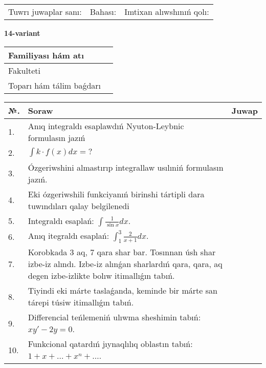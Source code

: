 \documentclass{article}
\begin{document}
\vspace{1cm}

\begin{tabular}{ c c c }
Tuwrı juwaplar sanı: \underline{\hspace{2cm}} & Bahası: \underline{\hspace{2cm}} & Imtixan alıwshınıń qolı: \underline{\hspace{2cm}} \\
\end{tabular}

\newpage

\begin{center}\textbf{14-variant}\end{center}

\bgroup
\def\arraystretch{1.5}
\begin{tabular}{ |m{6cm}|m{10cm}| }
  \hline
  Familiyası hám atı & \\
  \hline
  Fakulteti &\\
  \hline
  Toparı hám tálim baǵdarı & \\
  \hline
\end{tabular}
\egroup

\vspace{0.5cm}

\bgroup
\def\arraystretch{2}
\begin{tabular}{ |l|m{8cm}|m{7cm}| }
  \hline
  №. & Soraw & Juwap \\
  \hline
  1. & Anıq integraldı esaplawdıń Nyuton-Leybnic formulasın jazıń &  \\
  \hline
  2. & $\displaystyle\int k \cdot f(x)dx = ?$ &  \\
  \hline
  3. & Ózgeriwshini almastırıp integrallaw usılıniń formulasın jazıń. &  \\
  \hline
  4. & Eki ózgeriwshili funkciyanıń birinshi tártipli dara tuwındıları qalay belgilenedi &  \\
  \hline
  5. & Integraldı esaplań: $\displaystyle\int {\frac{1}{\sin x}dx} $. &  \\
  \hline
  6. & Anıq itegraldı esaplań: $\displaystyle\int_{1}^{3}{\frac{2}{x + 1}dx}$. &  \\
  \hline
  7. & Korobkada 3 aq, 7 qara shar bar. Tosınnan úsh shar izbe-iz alındı. Izbe-iz alınǵan sharlardıń qara, qara, aq degen izbe-izlikte bolıw itimallıǵın tabıń. &  \\
  \hline
  8. & Tiyindi eki márte taslaǵanda, keminde bir márte san tárepi túsiw itimallıǵın tabıń. &  \\
  \hline
  9. & Differencial teńlemeniń ulıwma sheshimin tabıń: $xy' - 2y = 0$. &  \\
  \hline
  10. & Funkcional qatardıń jıynaqlılıq oblastın tabıń: $1 + x + \ldots + x^{n} + \ldots$. &  \\
  \hline
\end{tabular}
\egroup
\end{document}
